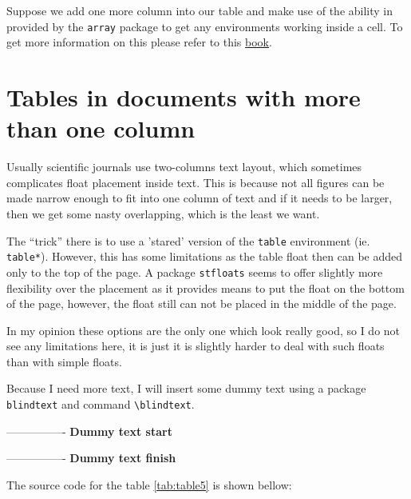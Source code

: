 Suppose we add one more column into our table and make use of the ability in
provided by the \verb|array| package to get any environments working inside a
cell. To get more information on this please refer to this 
\href{https://secure.wikimedia.org/wikibooks/en/wiki/LaTeX/Tables#The_table_environment_-_captioning_etc}{book}.




\section{Tables in documents with more than one column}

\begin{multicols}{2}
    

    Usually scientific journals use two-columns text layout, which sometimes
    complicates float placement inside text. This is because not all figures can
    be made narrow enough to fit into one column of text and if it needs to be
    larger, then we get some nasty overlapping, which is the least we want.

    The ``trick'' there is to use a 'stared' version of the \verb|table|
    environment (ie. \verb|table*|). However, this has some limitations as the
    table float then can be added only to the top of the page. A package
    \verb|stfloats| seems to offer slightly more flexibility over the placement
    as it provides means to put the float on the bottom of the page, however,
    the float still can not be placed in the middle of the page.

    In my opinion these options are the only one which look really good, so I do
    not see any limitations here, it is just it is slightly harder to deal with
    such floats than with simple floats.

    Because I need more text, I will insert some dummy text using a package
    \verb|blindtext| and command \verb|\blindtext|.

    ----------------
    \textbf{Dummy text start}

    \blindtext

    \blindtext

    ----------------
    \textbf{Dummy text finish}
\end{multicols}

The source code for the table \ref{tab:table5} is shown bellow:






